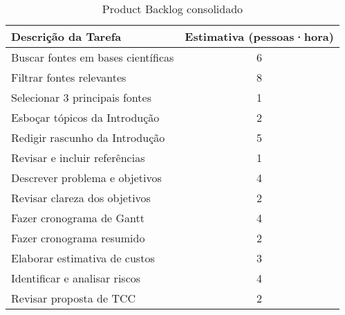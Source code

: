 \begin{table}[htbp]
  \centering
  \caption{Product Backlog consolidado}
  \label{tab:productbacklog}
  \begin{tabular}{lc}
    \toprule
    Descrição da Tarefa & Estimativa (pessoas·hora) \\
    \midrule
    Buscar fontes em bases científicas & 6 \\
    Filtrar fontes relevantes & 8 \\
    Selecionar 3 principais fontes & 1 \\
    Esboçar tópicos da Introdução & 2 \\
    Redigir rascunho da Introdução & 5 \\
    Revisar e incluir referências & 1 \\
    Descrever problema e objetivos & 4 \\
    Revisar clareza dos objetivos & 2 \\
    Fazer cronograma de Gantt & 4 \\
    Fazer cronograma resumido & 2 \\
    Elaborar estimativa de custos & 3 \\
    Identificar e analisar riscos & 4 \\
    Revisar proposta de TCC & 2 \\
    \bottomrule
  \end{tabular}
\end{table}
